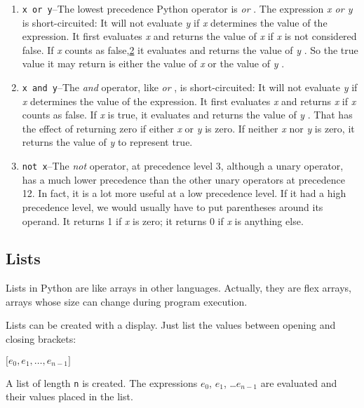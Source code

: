 \begin{enumerate}
\item
  
  \verb"x or y"--The lowest precedence Python operator is \emph{or} . The expression
  \emph{x or y} is short-circuited: It will not evaluate \emph{y} if
  \emph{x} determines the value of the expression. It first evaluates
  \emph{x} and returns the value of \emph{x} if \emph{x} is not
  considered false. If \emph{x} counts as
  false,\protect\hyperlink{pgfId-123468}{2} it evaluates and returns the
  value of \emph{y} . So the true value it may return is either the
  value of \emph{x} or the value of \emph{y} .
\item
  
  \verb"x and y"--The \emph{and} operator, like \emph{or} , is short-circuited: It
  will not evaluate \emph{y} if \emph{x} determines the value of the
  expression. It first evaluates \emph{x} and returns \emph{x} if
  \emph{x} counts as false. If \emph{x} is true, it evaluates and
  returns the value of \emph{y} . That has the effect of returning zero
  if either \emph{x} or \emph{y} is zero. If neither \emph{x} nor
  \emph{y} is zero, it returns the value of \emph{y} to represent true.
\item
  \verb"not x"--The
  \emph{not} operator, at precedence level 3, although a unary operator,
  has a much lower precedence than the other unary operators at
  precedence 12. In fact, it is a lot more useful at a low precedence
  level. If it had a high precedence level, we would usually have to put
  parentheses around its operand. It returns 1 if \emph{x} is zero; it
  returns 0 if \emph{x} is anything else.
\end{enumerate}

\subsection{Lists}

Lists in Python are like arrays in
other languages. Actually, they are flex arrays, arrays whose size can
change during program execution.

Lists can be created with a
display. Just list the values between opening and closing brackets:

$\lbrack e_0, e_1, \ldots, e_{n-1} \rbrack$

A list of length \texttt{n} is
created. The expressions $e_0$, $e_1$, \ldots $e_{n-1}$ are evaluated
and their values placed in the list.

